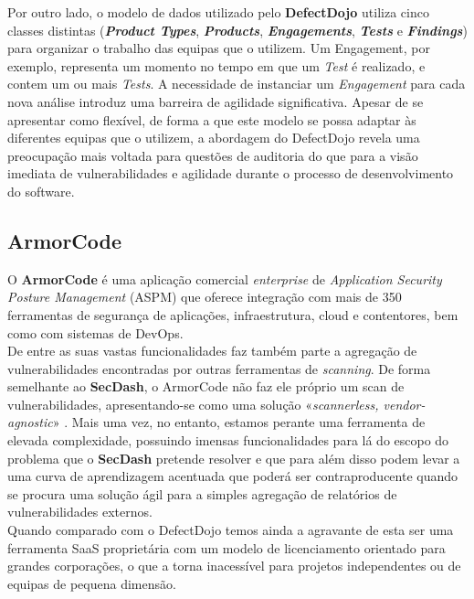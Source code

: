 Por outro lado, o modelo de dados utilizado pelo \textbf{DefectDojo} utiliza cinco classes distintas (\textbf{\textit{Product Types}}, \textbf{\textit{Products}}, \textbf{\textit{Engagements}}, \textbf{\textit{Tests}} e \textbf{\textit{Findings}}) para organizar o trabalho das equipas que o utilizem. \cite{modeldefectdojo} Um Engagement, por exemplo, representa um momento no tempo em que um \textit{Test} é realizado, e contem um ou mais \textit{Tests}. A necessidade de instanciar um \textit{Engagement} para cada nova análise introduz uma barreira de agilidade significativa. Apesar de se apresentar como flexível, de forma a que este modelo se possa adaptar às diferentes equipas que o utilizem, a abordagem do DefectDojo revela uma preocupação mais voltada para questões de auditoria do que para a visão imediata de vulnerabilidades e agilidade durante o processo de desenvolvimento do software.\\

\subsection{ArmorCode}
O \textbf{ArmorCode} é uma aplicação comercial \textit{enterprise} de \textit{Application Security Posture Management} (ASPM) que oferece integração com mais de 350 ferramentas de segurança de aplicações, infraestrutura, cloud e contentores, bem como com sistemas de DevOps. \\

De entre as suas vastas funcionalidades faz também parte a agregação de vulnerabilidades encontradas por outras ferramentas de \textit{scanning}. De forma semelhante ao \textbf{SecDash}, o ArmorCode não faz ele próprio um scan de vulnerabilidades, apresentando-se como uma solução «\textit{scannerless, vendor-agnostic}» \cite{scanerless}. Mais uma vez, no entanto, estamos perante uma ferramenta de elevada complexidade, possuindo imensas funcionalidades para lá do escopo do problema que o \textbf{SecDash} pretende resolver e que para além disso podem levar a uma curva de aprendizagem acentuada que poderá ser contraproducente quando se procura uma solução ágil para a simples agregação de relatórios de vulnerabilidades externos. \\

Quando comparado com o DefectDojo temos ainda a agravante de esta ser uma ferramenta SaaS proprietária com um modelo de licenciamento orientado para grandes corporações, o que a torna inacessível para projetos independentes ou de equipas de pequena dimensão. \\
